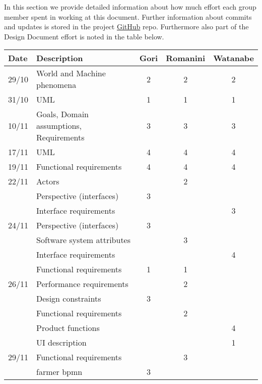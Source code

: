 In this section we provide detailed information about how much effort each group member spent in working at this document. Further information about commits and updates is stored in the project \href{https://github.com/MarcoRomanini/GoriRomaniniWatanabe}{GitHub} repo. Furthermore also part of the Design Document effort is noted in the table below. 


\begin{center}
    \setlength\arrayrulewidth{1pt}
    \begin{longtable}{llccc}
        
        \hline
        \rowcolor{myblue}\color{white}Date & \color{white}Description & \color{white}Gori & \color{white}Romanini & \color{white}Watanabe \\
        \hline
        29/10	&	World and Machine phenomena	&	2	&	2	&	2	\\
        \hline
        31/10	&	UML	&	1	&	1	&	1	\\
        \hline
        10/11	&	Goals, Domain assumptions, Requirements	&	3	&	3	&	3	\\
        \hline
        17/11	&	UML	&	4	&	4	&	4	\\
        \hline
        19/11	&	Functional requirements	&	4	&	4	&	4	\\
        \hline
        22/11	&	Actors	&		&	2	&		\\
        	&	Perspective (interfaces)	&	3	&		&		\\
        	&	Interface requirements	&		&		&	3	\\
        \hline
        24/11	&	Perspective (interfaces)	&	3	&		&		\\
        	&	Software system attributes	&		&	3	&		\\
        	&	Interface requirements	&		&		&	4	\\
        	&	Functional requirements	&	1	&	1	&		\\
        \hline
        26/11	&	Performance requirements	&		&	2	&		\\
        	&	Design constraints	&	3	&		&		\\
        	&	Functional requirements	&		&	2	&		\\
        	&	Product functions	&		&		&	4	\\
        	&	UI description	&		&		&	1	\\
        \hline
        29/11	&	Functional requirements	&		&	3	&		\\
        	&	farmer bpmn	&	3	&		&		\\

\end{longtable}
\end{center}
